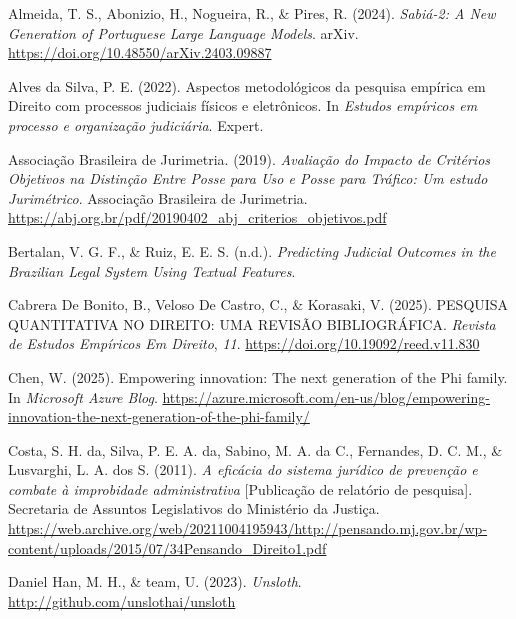 \documentclass[
  12pt,
]{article}
\newlength{\cslhangindent}
\newenvironment{CSLReferences}[2] %
 {\begin{list}{}{%
  \setlength{\itemindent}{0pt}
  \setlength{\leftmargin}{0pt}
  \setlength{\parsep}{0pt}
  \ifodd #1
   \setlength{\leftmargin}{\cslhangindent}
   \setlength{\itemindent}{-1\cslhangindent}
  \fi
  \setlength{\itemsep}{#2\baselineskip}}}
 {\end{list}}
\begin{document}
\label{refs}
\begin{CSLReferences}{1}{0}
Almeida, T. S., Abonizio, H., Nogueira, R., \& Pires, R. (2024).
\emph{Sabiá-2: {A} {New} {Generation} of {Portuguese} {Large} {Language}
{Models}}. arXiv. \url{https://doi.org/10.48550/arXiv.2403.09887}

Alves da Silva, P. E. (2022). Aspectos metodológicos da pesquisa
empírica em {Direito} com processos judiciais físicos e eletrônicos. In
\emph{Estudos empíricos em processo e organização judiciária}. Expert.

Associação Brasileira de Jurimetria. (2019). \emph{Avaliação do
{Impacto} de {Critérios} {Objetivos} na {Distinção} {Entre} {Posse} para
{Uso} e {Posse} para {Tráfico}: {Um} estudo {Jurimétrico}}. Associação
Brasileira de Jurimetria.
\url{https://abj.org.br/pdf/20190402_abj_criterios_objetivos.pdf}

Bertalan, V. G. F., \& Ruiz, E. E. S. (n.d.). \emph{Predicting
{Judicial} {Outcomes} in the {Brazilian} {Legal} {System} {Using}
{Textual} {Features}}.

Cabrera De Bonito, B., Veloso De Castro, C., \& Korasaki, V. (2025).
{PESQUISA} {QUANTITATIVA} {NO} {DIREITO}: {UMA} {REVISÃO}
{BIBLIOGRÁFICA}. \emph{Revista de Estudos Empíricos Em Direito},
\emph{11}. \url{https://doi.org/10.19092/reed.v11.830}

Chen, W. (2025). Empowering innovation: {The} next generation of the
{Phi} family. In \emph{Microsoft Azure Blog}.
\url{https://azure.microsoft.com/en-us/blog/empowering-innovation-the-next-generation-of-the-phi-family/}

Costa, S. H. da, Silva, P. E. A. da, Sabino, M. A. da C., Fernandes, D.
C. M., \& Lusvarghi, L. A. dos S. (2011). \emph{A eficácia do sistema
jurídico de prevenção e combate à improbidade administrativa}
{[}Publicação de relatório de pesquisa{]}. Secretaria de Assuntos
Legislativos do Ministério da Justiça.
\url{https://web.archive.org/web/20211004195943/http://pensando.mj.gov.br/wp-content/uploads/2015/07/34Pensando_Direito1.pdf}

Daniel Han, M. H., \& team, U. (2023). \emph{Unsloth}.
\url{http://github.com/unslothai/unsloth}


\end{CSLReferences}
\end{document}

